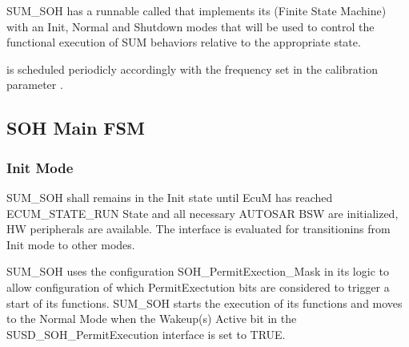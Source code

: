 {SUM_SOH has a runnable called  that implements its  (Finite State Machine) with an Init, Normal and Shutdown modes that will be used to control
the functional execution of SUM behaviors relative to the appropriate state.

 is scheduled periodicly accordingly with the frequency set in the calibration parameter .

}{
 
}


\subsection{SOH Main FSM}
\label{subsec:mainfsm}


\subsubsection{Init Mode}

{SUM_SOH shall remains in the Init state until EcuM has reached ECUM_STATE_RUN State and
all necessary AUTOSAR BSW are initialized, HW peripherals are available.  The  interface is evaluated for transitionins from Init mode to other modes.
}{
}

{SUM_SOH uses the configuration SOH_PermitExection_Mask in its logic to allow configuration of which PermitExectution bits are considered to trigger a start of its functions.
 SUM_SOH starts the execution of its functions and moves to the Normal Mode when the Wakeup(s) Active bit in the SUSD_SOH_PermitExecution interface is set to TRUE. 
}
{
}

